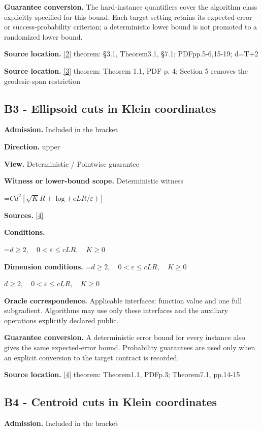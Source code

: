 \documentclass[10pt,a4paper]{article}
\newcommand{\AtlasMath}[1]{\par\begingroup\centering\setbox0=\hbox{$\displaystyle #1$}\ifdim\wd0>1.4\linewidth\typeout{ATLAS WIDE FORMULA: \the\wd0}\fi\ifdim\wd0>\linewidth\resizebox{\linewidth}{!}{\box0}\else\box0\fi\par\endgroup}
\newcommand{\AtlasInlineMath}[1]{\begingroup\setbox0=\hbox{$#1$}\ifdim\wd0>.4\linewidth\endgroup\AtlasMath{#1}\else\endgroup$#1$\fi}
\begin{document}
\textbf{Guarantee conversion.} The hard-instance quantifiers cover the algorithm class explicitly specified for this bound. Each target setting retains its expected-error or success-probability criterion; a deterministic lower bound is not promoted to a randomized lower bound.

\textbf{Source location.} \href{https://arxiv.org/pdf/2610.12184v3}{[2]} theorem: §3.1, Theorem3.1, §7.1; PDFpp.5-6,15-19; d=T+2

\textbf{Source location.} \href{https://arxiv.org/pdf/2610.26815v1}{[3]} theorem: Theorem 1.1, PDF p. 4; Section 5 removes the geodesic-span restriction

\subsection{B3 - Ellipsoid cuts in Klein coordinates}
\textbf{Admission.} Included in the bracket

\textbf{Direction.} upper

\textbf{View.} Deterministic / Pointwise guarantee

\textbf{Witness or lower-bound scope.} Deterministic witness

\AtlasMath{C d^2[\sqrt K R+\log(eLR/\varepsilon)]}
\textbf{Sources.} \href{https://arxiv.org/pdf/2605.17540v4}{[4]}

\textbf{Conditions.} 
\AtlasMath{d\ge2,\quad0<\varepsilon\le cLR,\quad K\ge0}


\textbf{Dimension conditions.} \AtlasInlineMath{d\ge2,\quad0<\varepsilon\le cLR,\quad K\ge0}

\textbf{Oracle correspondence.} Applicable interfaces: function value and one full subgradient. Algorithms may use only these interfaces and the auxiliary operations explicitly declared public.

\textbf{Guarantee conversion.} A deterministic error bound for every instance also gives the same expected-error bound. Probability guarantees are used only when an explicit conversion to the target contract is recorded.

\textbf{Source location.} \href{https://arxiv.org/pdf/2605.17540v4}{[4]} theorem: Theorem1.1, PDFp.3; Theorem7.1, pp.14-15

\subsection{B4 - Centroid cuts in Klein coordinates}
\textbf{Admission.} Included in the bracket
\end{document}
